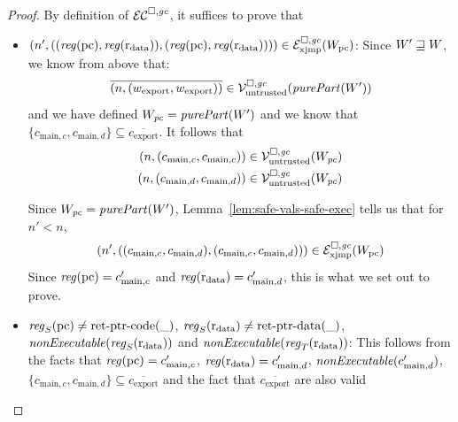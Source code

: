 \documentclass[a4paper]{article}
\begin{document}
\begin{proof}
  By definition of $\lrec$, it suffices to prove that 
  \begin{itemize}
  \item 
    $\npair[n']{( (\reg(\pcreg),\reg(\rdata)), (\reg(\pcreg),\reg(\rdata)) )} \in \lrexj(W_\pcreg)$:
    Since $W' \future W$, we know from above that:
    \begin{equation*}
      \overline{\npair{(w_{\mathrm{export}},w_{\mathrm{export}})}} \in \lrv(\purePart{W'})
    \end{equation*}
    and we have defined $W_\pc = \purePart{W'}$ and we know that $\{c_{\mathrm{main},c}, c_{\mathrm{main},d}\}\subseteq
    \overline{c_{\mathrm{export}}}$.
    It follows that 
    \begin{align*}
      \npair{(c_{\mathrm{main},c},c_{\mathrm{main},c})} &\in \lrv(W_\pc)\\
      \npair{(c_{\mathrm{main},d},c_{\mathrm{main},d})} &\in \lrv(W_\pc)
    \end{align*}

    Since $W_\pc = \purePart{W'}$, Lemma~\ref{lem:safe-vals-safe-exec} tells us that for $n' < n$,
    \begin{equation*}
      \npair[n']{( (c_{\mathrm{main},c},c_{\mathrm{main},d}), (c_{\mathrm{main},c},c_{\mathrm{main},d}) )} \in \lrexj(W_\pcreg)
    \end{equation*}
    Since $\reg(\pcreg) = c_{\mathrm{main},c}'$ and $\reg(\rdata) = c_{\mathrm{main},d}'$, this is what we set out to prove.

  \item $\reg_S(\pcreg) \neq \retptrc(\_)$, $\reg_S(\rdata) \neq \retptrd(\_)$, $\nonExec{\reg_S(\rdata)}$ and $\nonExec{\reg_T(\rdata)}$:
    This follows from the facts that $\reg(\pcreg) = c_{\mathrm{main},c}'$, $\reg(\rdata) = c_{\mathrm{main},d}'$, 
    $\nonExec{c_{\mathrm{main},d}'}$, $\{c_{\mathrm{main},c}, c_{\mathrm{main},d}\}\subseteq \overline{c_{\mathrm{export}}}$ and the fact that $\overline{c_{\mathrm{export}}}$ are also valid 


\end{itemize}
\end{proof}
\end{document}
